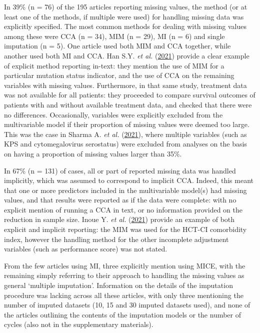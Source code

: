 \documentclass[
  letterpaper,
  DIV=11,
  numbers=noendperiod]{scrreprt}
\begin{document}
In 39\% (n = 76) of the 195 articles reporting missing values, the
method (or at least one of the methods, if multiple were used) for
handling missing data was explicitly specified. The most common methods
for dealing with missing values among these were CCA (n = 34), MIM (n =
29), MI (n = 6) and single imputation (n = 5). One article used both MIM
and CCA together, while another used both MI and CCA. Han S.Y. \emph{et
al.}
(\protect\hyperlink{ref-hans.y.SecondaryCytogeneticAbnormalities2021}{2021})
provide a clear example of explicit method reporting in-text: they
mention the use of MIM for a particular mutation status indicator, and
the use of CCA on the remaining variables with missing values.
Furthermore, in that same study, treatment data was not available for
all patients: they proceeded to compare survival outcomes of patients
with and without available treatment data, and checked that there were
no differences. Occasionally, variables were explicitly excluded from
the multivariable model if their proportion of missing values were
deemed too large. This was the case in Sharma A. \emph{et al.}
(\protect\hyperlink{ref-sharmaa.OutcomesPediatricPatients2021}{2021}),
where multiple variables (such as KPS and cytomegalovirus serostatus)
were excluded from analyses on the basis on having a proportion of
missing values larger than 35\%.

In 67\% (n = 131) of cases, all or part of reported missing data was
handled implicitly, which was assumed to correspond to implicit CCA.
Indeed, this meant that one or more predictors included in the
multivariable model(s) had missing values, and that results were
reported as if the data were complete: with no explicit mention of
running a CCA in text, or no information provided on the reduction in
sample size. Inoue Y. \emph{et al.}
(\protect\hyperlink{ref-inouey.ImpactConditioningIntensity2021}{2021})
provide an example of both explicit and implicit reporting: the MIM was
used for the HCT-CI comorbidity index, however the handling method for
the other incomplete adjustment variables (such as performance score)
was not stated.

From the few articles using MI, three explicitly mention using MICE,
with the remaining simply referring to their approach to handling the
missing values as general `multiple imputation'. Information on the
details of the imputation procedure was lacking across all these
articles, with only three mentioning the number of imputed datasets (10,
15 and 30 imputed datasets used), and none of the articles outlining the
contents of the imputation models or the number of cycles (also not in
the supplementary materials).
\end{document}
